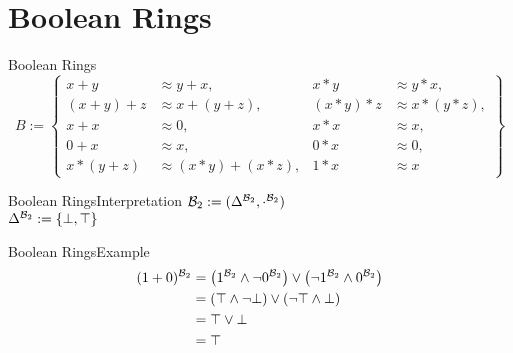\section{Boolean Rings}
\begin{frame}{Boolean Rings}
\[B:=\left\lbrace 
	\begin{aligned}
		x+y     & \approx y+x,         & x*y     & \approx y*x,     \\
		(x+y)+z & \approx x+(y+z),     & (x*y)*z & \approx x*(y*z), \\
		x+x     & \approx 0,           & x*x     & \approx x,       \\
		0+x     & \approx x,           & 0*x     & \approx 0,       \\
		x*(y+z) & \approx (x*y)+(x*z), & 1*x     & \approx x        
	\end{aligned}
	\right\rbrace \]
\end{frame}

\begin{frame}{Boolean Rings}{Interpretation}
${\mathcal{B}_2}:=(\Delta^{\mathcal{B}_2},\cdot^{\mathcal{B}_2})$\\
\vspace{10pt}\hspace{10pt}
$\Delta^{\mathcal{B}_2}:=\left\lbrace\bot,\top\right\rbrace$
\end{frame}

\begin{frame}{Boolean Rings}{Example}	
\begin{align*}
	(1+0)^{\mathcal{B}_2}&=\left( 1^{\mathcal{B}_2}\wedge\neg 0^{\mathcal{B}_2}\right) \vee \left( \neg1^{\mathcal{B}_2}\wedge 0^{\mathcal{B}_2}\right) \\
	&=\left( \top\wedge\neg\bot\right) \vee\left(\neg\top\wedge\bot \right) \\
	&=\top\vee\bot\\
	&=\top
\end{align*}
\end{frame}


